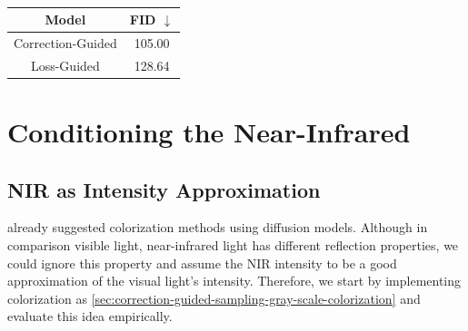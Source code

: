 \begin{table}[htp!]
    \centering
    \begin{tabular}{c | c}
        Model             & FID  $\downarrow$ \\
        \hline\hline
        Correction-Guided & 105.00            \\
        Loss-Guided       & 128.64
    \end{tabular}
    \caption{
    }
    \label{fig:quantitative-evaluation-loss-guided-vs-correction-guided}
\end{table}



\section{Conditioning the Near-Infrared}
\subsection{NIR as Intensity Approximation}
\label{sec:nir-as-intensity-approximation-evaluation}
\Textcite{sbgm} already suggested colorization methods using diffusion models.
Although in comparison visible light, near-infrared light has different reflection properties,
we could ignore this property and assume the NIR intensity to be a good approximation of the visual light's intensity.
Therefore, we start by implementing colorization as \autoref{sec:correction-guided-sampling-gray-scale-colorization} and evaluate
this idea empirically.

